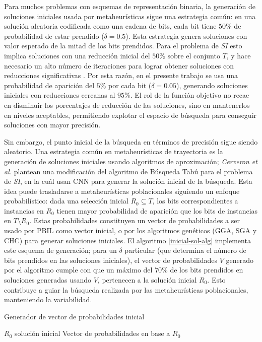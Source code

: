 Para muchos problemas con esquemas de representación binaria, la generación de soluciones iniciales usada por metaheurísticas sigue una estrategia común: en una solución aleatoria codificada como una cadena de bits, cada bit tiene $50\%$ de probabilidad de estar prendido ($\delta = 0.5$). Esta estrategia genera soluciones con valor esperado de la mitad de los bits prendidos. Para el problema de \emph{SI} esto implica soluciones con una reducción inicial del $50\%$ sobre el conjunto $T$, y hace necesario un alto número de iteraciones para lograr obtener soluciones con reducciones significativas \cite{cano2003using}. Por esta razón, en el presente trabajo se usa una probabilidad de aparición del $5\%$ por cada bit ($\delta = 0.05$), generando soluciones iniciales con reducciones cercanas al $95\%$. El rol de la función objetivo no recae en disminuir los porcentajes de reducción de las soluciones, sino en mantenerlos en niveles aceptables, permitiendo explotar el espacio de búsqueda para conseguir soluciones con mayor precisión.

Sin embargo, el punto inicial de la búsqueda en términos de precisión sigue siendo aleatorio. Una estrategia común en metaheurísticas de trayectoria es la generación de soluciones iniciales usando algoritmos de aproximación; \emph{Cerveron et al.} \cite{cerveron2001another} plantean una modificación del algoritmo de Búsqueda Tabú para el problema de \emph{SI}, en la cuál usan CNN para generar la solución inicial de la búsqueda. Esta idea puede trasladarse a metaheurísticas poblacionales siguiendo un enfoque probabilístico: dada una selección inicial $R_0 \subseteq T$, los bits correspondientes a instancias en $R_0$ tienen mayor probabilidad de aparición que los bits de instancias en $T \setminus R_0$. Estas probabilidades constituyen un vector de probabilidades a ser usado por PBIL como vector inicial, o por los algoritmos genéticos (GGA, SGA y CHC) para generar soluciones iniciales. El algoritmo \ref{inicial-sol-alg} implementa este esquema de generación; para un $\delta$ particular (que determina el número de bits prendidos en las soluciones iniciales), el vector de probabilidades $V$ generado por el algoritmo cumple con que un máximo del $70\%$ de los bits prendidos en soluciones generadas usando $V$, pertenecen a la solución inicial $R_0$. Esto contribuye a guiar la búsqueda realizada por las metaheurísticas poblacionales, manteniendo la variabilidad.

\begin{algorithm}
\caption{Generador de vector de probabilidades inicial}
\label{inicial-sol-alg}
\begin{algorithmic}[1]

\Require $R_0$ solución inicial
\Ensure Vector de probabilidades en base a $R_0$

	\Else
	\EndIf
\EndFor
\State {}
\end{algorithmic}
\end{algorithm}

